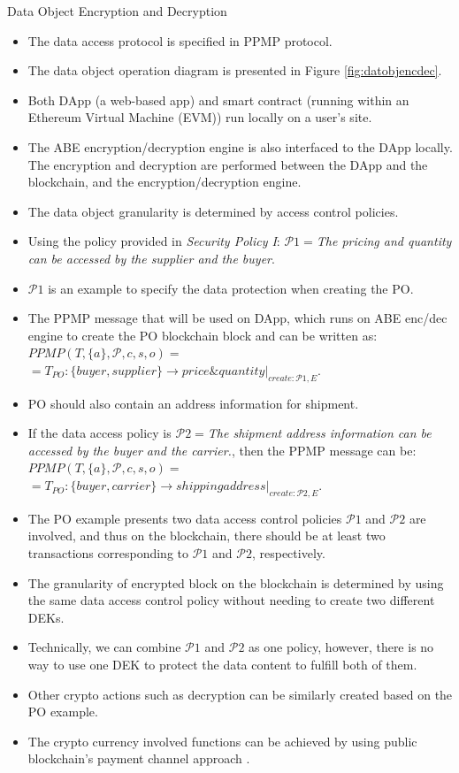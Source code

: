 \documentclass[11pt]{beamer}
\begin{document}
\begin{frame}[allowframebreaks]{Data Object Encryption and Decryption}
\begin{itemize}
\item The data access protocol is specified in PPMP protocol.
\item The data object operation diagram is presented in Figure \ref{fig:datobjencdec}.
\item Both DApp (a web-based app) and smart contract (running within an Ethereum Virtual Machine (EVM)) run locally on a user's site.
\item The ABE encryption/decryption engine is also interfaced to the DApp locally. The encryption and decryption are performed between the DApp and the blockchain, and the encryption/decryption engine.
\item The data object granularity is determined by access control policies.
\item Using the policy provided in \textit{Security Policy I}: 
$\mathcal{P}1=$\textit{The pricing and quantity can be accessed by the supplier and the buyer}.
\item $\mathcal{P}1$ is an example to specify the data protection when creating the PO.
\item The PPMP message that will be used on DApp, which runs on ABE enc/dec engine to create the PO blockchain block and can be written as:\\
$PPMP(T, \{a\}, \mathcal{P},c ,s, o) =$\\
$= T_{PO}: \{buyer, supplier\} \rightarrow price\&quantity|_{create:\mathcal{P}1,E}$.
\item PO should also contain an address information for shipment.
\item If the data access policy is $\mathcal{P}2=$\textit{The shipment address information can be accessed by the buyer and the carrier.}, then the PPMP message can be:\\
$PPMP(T, \{a\}, \mathcal{P},c ,s, o) =$\\
$= T_{PO}: \{buyer, carrier\} \rightarrow shipping address|_{create:\mathcal{P}2,E}$.
\item The PO example presents two data access control policies $\mathcal{P}1$ and $\mathcal{P}2$ are involved, and thus on the blockchain, there should be at least two transactions corresponding to $\mathcal{P}1$ and $\mathcal{P}2$, respectively.
\item The granularity of encrypted block on the blockchain is determined by using the same data access control policy without needing to create two different DEKs.
\item Technically, we can combine $\mathcal{P}1$ and $\mathcal{P}2$ as one policy, however, there is no way to use one DEK to protect the data content to fulfill both of them.
\item  Other crypto actions such as decryption can be similarly created based on the PO example.
\item The crypto currency involved functions can be achieved by using public blockchain’s payment channel approach .
\end{itemize}

\end{frame}
\end{document}
